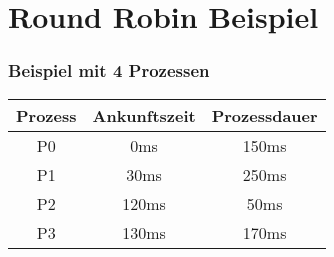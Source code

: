 \section{Round Robin Beispiel}

\begin{frame}
    \frametitle{Beispiel mit 4 Prozessen}

    \begin{table}[]
        \begin{adjustbox}{width=0.4\textwidth}
            \begin{tabular}{c|c|c}
                \textbf{Prozess} & \textbf{Ankunftszeit} & \textbf{Prozessdauer} \\
                \hline{}
                P0               & 0ms                   & 150ms                 \\
                P1               & 30ms                  & 250ms                 \\
                P2               & 120ms                 & 50ms                  \\
                P3               & 130ms                 & 170ms
            \end{tabular}
        \end{adjustbox}
    \end{table}


\end{frame}
